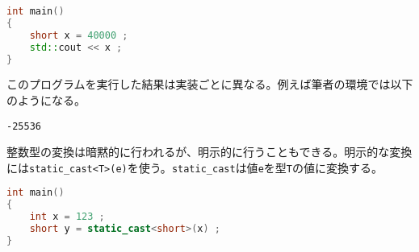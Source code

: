 \begin{lstlisting}[language={C++}]
int main()
{
    short x = 40000 ;
    std::cout << x ;
}
\end{lstlisting}

このプログラムを実行した結果は実装ごとに異なる。例えば筆者の環境では以下のようになる。

\begin{lstlisting}[style=terminal]
-25536
\end{lstlisting}

整数型の変換は暗黙的に行われるが、明示的に行うこともできる。明示的な変換には\texttt{static\_cast<T>(e)}を使う。\texttt{static\_cast}は値\texttt{e}を型\texttt{T}の値に変換する。

\begin{lstlisting}[language={C++}]
int main()
{
    int x = 123 ;
    short y = static_cast<short>(x) ;
}
\end{lstlisting}

